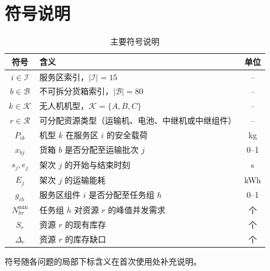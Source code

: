 \section{符号说明}
\begin{table}[htbp]
\centering
\caption{主要符号说明}
\begin{tabular}{c p{8.5cm} c}
\toprule
符号 & 含义 & 单位\\
\midrule
$i\in\mathcal I$ & 服务区索引，$|\mathcal I|=15$ & --\\
$b\in\mathcal B$ & 不可拆分货箱索引，$|\mathcal B|=80$ & --\\
$k\in\mathcal K$ & 无人机机型，$\mathcal K=\{A,B,C\}$ & --\\
$r\in\mathcal R$ & 可分配资源类型（运输机、电池、中继机或中继组件） & --\\
$P_{ik}$ & 机型 $k$ 在服务区 $i$ 的安全载荷 & kg\\
$x_{bj}$ & 货箱 $b$ 是否分配至运输批次 $j$ & 0--1\\
$s_j,e_j$ & 架次 $j$ 的开始与结束时刻 & s\\
$E_j$ & 架次 $j$ 的运输能耗 & kWh\\
$g_{ih}$ & 服务区组件 $i$ 是否分配至任务组 $h$ & 0--1\\
$N_{hr}^{\min}$ & 任务组 $h$ 对资源 $r$ 的峰值并发需求 & 个\\
$S_r$ & 资源 $r$ 的现有库存 & 个\\
$\Delta_r$ & 资源 $r$ 的库存缺口 & 个\\
\bottomrule
\end{tabular}
\end{table}
符号随各问题的局部下标含义在首次使用处补充说明。
